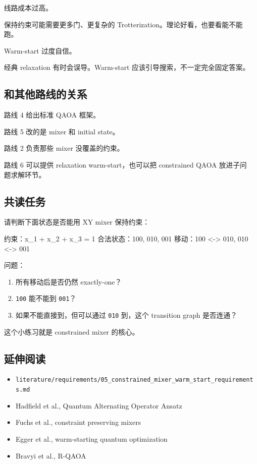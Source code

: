 \documentclass[UTF8,12pt,a4paper]{ctexart}
\begin{document}
线路成本过高。

保持约束可能需要更多门、更复杂的 Trotterization。理论好看，也要看能不能跑。

Warm-start 过度自信。

经典 relaxation 有时会误导。Warm-start 应该引导搜索，不一定完全固定答案。

\subsection*{和其他路线的关系}

路线 4 给出标准 QAOA 框架。

路线 5 改的是 mixer 和 initial state。

路线 2 负责那些 mixer 没覆盖的约束。

路线 6 可以提供 relaxation warm-start，也可以把 constrained QAOA 放进子问题求解环节。

\subsection*{共读任务}

请判断下面状态是否能用 XY mixer 保持约束：

\begin{GuideVerbatim}
约束：x_1 + x_2 + x_3 = 1
合法状态：100, 010, 001
移动：100 <-> 010, 010 <-> 001
\end{GuideVerbatim}

问题：

\begin{enumerate}
\item 所有移动后是否仍然 exactly-one？
\item \texttt{100} 能不能到 \texttt{001}？
\item 如果不能直接到，但可以通过 \texttt{010} 到，这个 transition graph 是否连通？
\end{enumerate}

这个小练习就是 constrained mixer 的核心。

\subsection*{延伸阅读}

\begin{itemize}
\item \texttt{literature/requirements/05\_constrained\_mixer\_warm\_start\_requirements.md}
\item Hadfield et al., Quantum Alternating Operator Ansatz
\item Fuchs et al., constraint preserving mixers
\item Egger et al., warm-starting quantum optimization
\item Bravyi et al., R-QAOA
\end{itemize}
\end{document}
